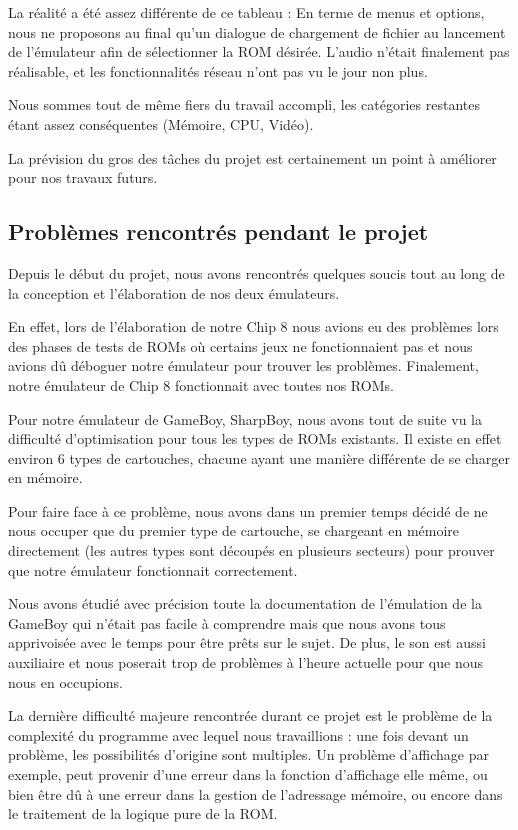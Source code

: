 \documentclass[12pt, a4paper]{article}
\begin{document}
La réalité a été assez différente de ce tableau : En terme de menus et options, nous ne proposons au final qu'un dialogue de chargement de fichier au lancement de l'émulateur afin de sélectionner la ROM désirée.
L'audio n'était finalement pas réalisable, et les fonctionnalités réseau n'ont pas vu le jour non plus.

Nous sommes tout de même fiers du travail accompli, les catégories restantes étant assez conséquentes (Mémoire, CPU, Vidéo).

La prévision du gros des tâches du projet est certainement un point à améliorer pour nos travaux futurs.
\pagebreak

\subsection{Problèmes rencontrés pendant le projet}

Depuis le début du projet, nous avons rencontrés quelques soucis tout au long de la conception et l'élaboration de nos deux émulateurs.

\bigskip
En effet, lors de l'élaboration de notre Chip 8 nous avions eu des problèmes lors des phases de tests de ROMs où certains jeux ne fonctionnaient pas et nous avions dû déboguer notre émulateur pour trouver les problèmes. Finalement, notre émulateur de Chip 8 fonctionnait avec toutes nos ROMs.

\bigskip
Pour notre émulateur de GameBoy, SharpBoy, nous avons tout de suite vu la difficulté d'optimisation pour tous les types de ROMs existants. Il existe en effet environ 6 types de cartouches, chacune ayant une manière différente de se charger en mémoire. 

Pour faire face à ce problème, nous avons dans un premier temps décidé de ne nous occuper que du premier type de cartouche, se chargeant en mémoire directement (les autres types sont découpés en plusieurs secteurs) pour prouver que notre émulateur fonctionnait correctement. 

\bigskip
Nous avons étudié avec précision toute la documentation de l'émulation de la GameBoy qui n'était pas facile à comprendre mais que nous avons tous apprivoisée avec le temps pour être prêts sur le sujet. De plus, le son est aussi auxiliaire et nous poserait trop de problèmes à l'heure actuelle pour que nous nous en occupions.
\pagebreak

\bigskip
La dernière difficulté majeure rencontrée durant ce projet est le problème de la complexité du programme avec lequel nous travaillions : une fois devant un problème, les possibilités d'origine sont multiples. Un problème d'affichage par exemple, peut provenir d'une erreur dans la fonction d'affichage elle même, ou bien être dû à une erreur dans la gestion de l'adressage mémoire, ou encore dans le traitement de la logique pure de la ROM. 
\end{document}

